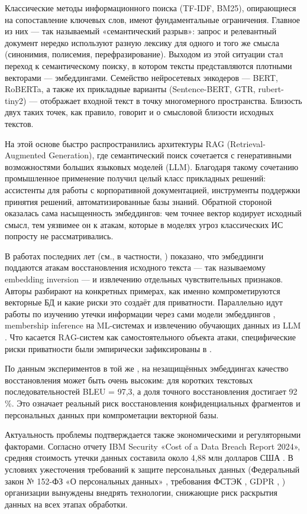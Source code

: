 \documentclass[a4paper, 12pt, oneside, openany]{article}
\begin{document}
Классические методы информационного поиска (TF-IDF, BM25), опирающиеся на сопоставление ключевых слов, имеют фундаментальные ограничения. Главное из них — так называемый «семантический разрыв»: запрос и релевантный документ нередко используют разную лексику для одного и того же смысла (синонимия, полисемия, перефразирование). Выходом из этой ситуации стал переход к семантическому поиску, в котором тексты представляются плотными векторами — эмбеддингами. Семейство нейросетевых энкодеров — BERT, RoBERTa, а также их прикладные варианты (Sentence-BERT, GTR, rubert-tiny2) — отображает входной текст в точку многомерного пространства. Близость двух таких точек, как правило, говорит и о смысловой близости исходных текстов.

На этой основе быстро распространились архитектуры RAG (Retrieval-Augmented Generation), где семантический поиск сочетается с генеративными возможностями больших языковых моделей (LLM). Благодаря такому сочетанию промышленное применение получил целый класс прикладных решений: ассистенты для работы с корпоративной документацией, инструменты поддержки принятия решений, автоматизированные базы знаний. Обратной стороной оказалась сама насыщенность эмбеддингов: чем точнее вектор кодирует исходный смысл, тем уязвимее он к атакам, которые в моделях угроз классических ИС попросту не рассматривались.

В работах последних лет (см., в частности, \cite{ref5}) показано, что эмбеддинги поддаются атакам восстановления исходного текста — так называемому embedding inversion — и извлечению отдельных чувствительных признаков. Авторы \cite{ref5,ref6,ref7,ref8} разбирают на конкретных примерах, как именно компрометируются векторные БД и какие риски это создаёт для приватности. Параллельно идут работы по изучению утечки информации через сами модели эмбеддингов \cite{ref42}, membership inference на ML-системах \cite{ref40} и извлечению обучающих данных из LLM \cite{ref41}. Что касается RAG-систем как самостоятельного объекта атаки, специфические риски приватности были эмпирически зафиксированы в \cite{ref45}.

По данным экспериментов в той же \cite{ref5}, на незащищённых эмбеддингах качество восстановления может быть очень высоким: для коротких текстовых последовательностей BLEU = 97{,}3, а доля точного восстановления достигает 92\,\%. Это означает реальный риск восстановления конфиденциальных фрагментов и персональных данных при компрометации векторной базы.

Актуальность проблемы подтверждается также экономическими и регуляторными факторами. Согласно отчету IBM Security «Cost of a Data Breach Report 2024», средняя стоимость утечки данных составила около 4,88 млн долларов США \cite{ref9}. В условиях ужесточения требований к защите персональных данных (Федеральный закон № 152-ФЗ «О персональных данных» \cite{ref59}, требования ФСТЭК \cite{ref61}, GDPR \cite{ref11}, ) организации вынуждены внедрять технологии, снижающие риск раскрытия данных на всех этапах обработки.
\end{document}
